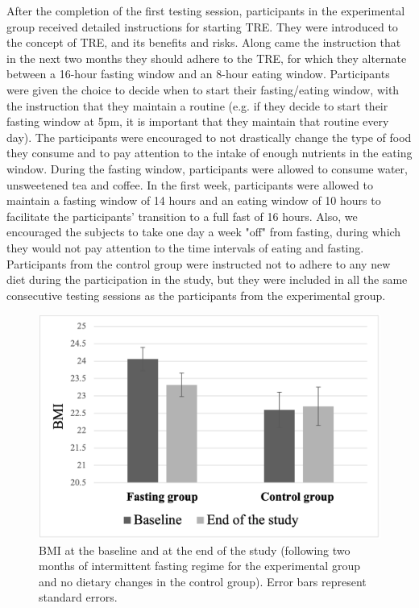 \documentclass[authordate, empirical,issue]{jote-new-article}
\begin{document}
After the completion of the first testing session, participants in the experimental group received detailed instructions for starting TRE. They were introduced to the concept of TRE, and its benefits and risks. Along came the instruction that in the next two months they should adhere to the TRE, for which they alternate between a 16-hour fasting window and an 8-hour eating window. Participants were given the choice to decide when to start their fasting/eating window, with the instruction that they maintain a routine (e.g. if they decide to start their fasting window at 5pm, it is important that they maintain that routine every day). The participants were encouraged to not drastically change the type of food they consume and to pay attention to the intake of enough nutrients in the eating window. During the fasting window, participants were allowed to consume water, unsweetened tea and coffee. In the first week, participants were allowed to maintain a fasting window of 14 hours and an eating window of 10 hours to facilitate the participants' transition to a full fast of 16 hours. Also, we encouraged the subjects to take one day a week "off" from fasting, during which they would not pay attention to the time intervals of eating and fasting. Participants from the control group were instructed not to adhere to any new diet during the participation in the study, but they were included in all the same consecutive testing sessions as the participants from the experimental group.


\begin{figure}
  \begin{fullwidth}
    \includegraphics[width=\linewidth]{media/image2.png}
    \caption{BMI at the baseline and at the end of the study (following two months of intermittent fasting regime for the experimental group and no dietary changes in the control group). Error bars represent standard errors.}

  \end{fullwidth}
\end{figure}
\end{document}

